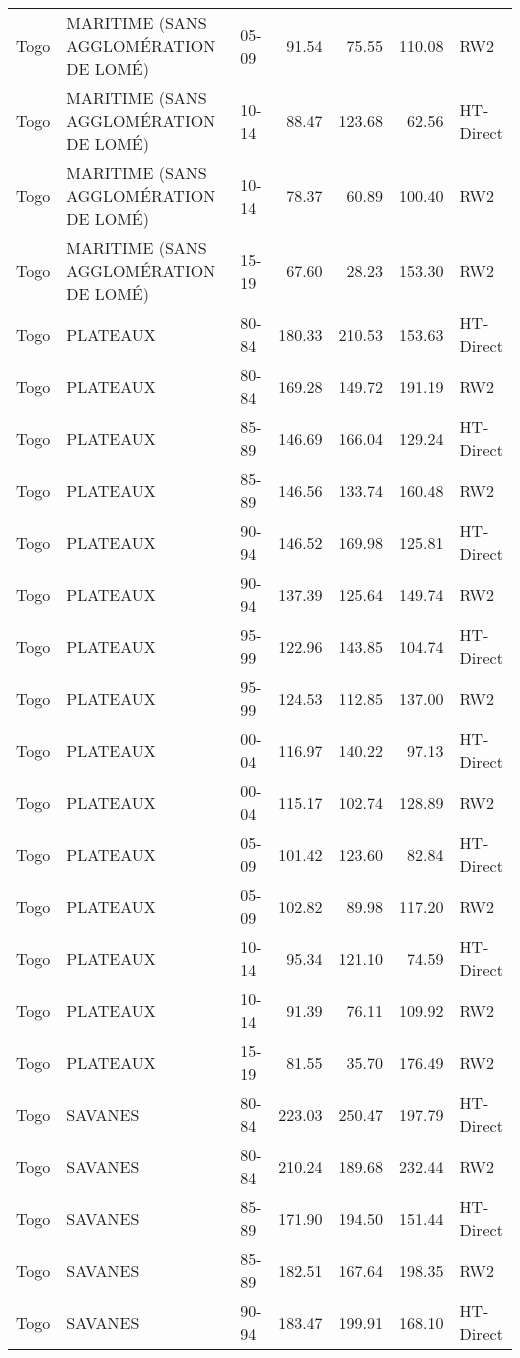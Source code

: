\begin{longtable}{lllrrrl}
  Togo & MARITIME (SANS AGGLOMÉRATION DE LOMÉ) & 05-09 & 91.54 & 75.55 & 110.08 & RW2 \\ 
  Togo & MARITIME (SANS AGGLOMÉRATION DE LOMÉ) & 10-14 & 88.47 & 123.68 & 62.56 & HT-Direct \\ 
  Togo & MARITIME (SANS AGGLOMÉRATION DE LOMÉ) & 10-14 & 78.37 & 60.89 & 100.40 & RW2 \\ 
  Togo & MARITIME (SANS AGGLOMÉRATION DE LOMÉ) & 15-19 & 67.60 & 28.23 & 153.30 & RW2 \\ 
  Togo & PLATEAUX & 80-84 & 180.33 & 210.53 & 153.63 & HT-Direct \\ 
  Togo & PLATEAUX & 80-84 & 169.28 & 149.72 & 191.19 & RW2 \\ 
  Togo & PLATEAUX & 85-89 & 146.69 & 166.04 & 129.24 & HT-Direct \\ 
  Togo & PLATEAUX & 85-89 & 146.56 & 133.74 & 160.48 & RW2 \\ 
  Togo & PLATEAUX & 90-94 & 146.52 & 169.98 & 125.81 & HT-Direct \\ 
  Togo & PLATEAUX & 90-94 & 137.39 & 125.64 & 149.74 & RW2 \\ 
  Togo & PLATEAUX & 95-99 & 122.96 & 143.85 & 104.74 & HT-Direct \\ 
  Togo & PLATEAUX & 95-99 & 124.53 & 112.85 & 137.00 & RW2 \\ 
  Togo & PLATEAUX & 00-04 & 116.97 & 140.22 & 97.13 & HT-Direct \\ 
  Togo & PLATEAUX & 00-04 & 115.17 & 102.74 & 128.89 & RW2 \\ 
  Togo & PLATEAUX & 05-09 & 101.42 & 123.60 & 82.84 & HT-Direct \\ 
  Togo & PLATEAUX & 05-09 & 102.82 & 89.98 & 117.20 & RW2 \\ 
  Togo & PLATEAUX & 10-14 & 95.34 & 121.10 & 74.59 & HT-Direct \\ 
  Togo & PLATEAUX & 10-14 & 91.39 & 76.11 & 109.92 & RW2 \\ 
  Togo & PLATEAUX & 15-19 & 81.55 & 35.70 & 176.49 & RW2 \\ 
  Togo & SAVANES & 80-84 & 223.03 & 250.47 & 197.79 & HT-Direct \\ 
  Togo & SAVANES & 80-84 & 210.24 & 189.68 & 232.44 & RW2 \\ 
  Togo & SAVANES & 85-89 & 171.90 & 194.50 & 151.44 & HT-Direct \\ 
  Togo & SAVANES & 85-89 & 182.51 & 167.64 & 198.35 & RW2 \\ 
  Togo & SAVANES & 90-94 & 183.47 & 199.91 & 168.10 & HT-Direct \\ 

\end{longtable}
